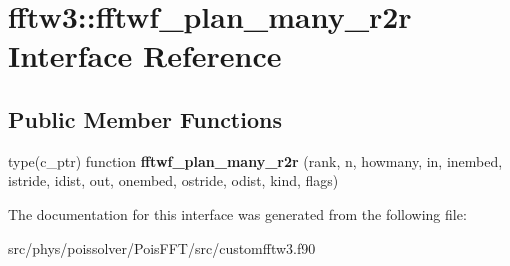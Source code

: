 \hypertarget{interfacefftw3_1_1fftwf__plan__many__r2r}{}\section{fftw3\+:\+:fftwf\+\_\+plan\+\_\+many\+\_\+r2r Interface Reference}
\label{interfacefftw3_1_1fftwf__plan__many__r2r}
\subsection*{Public Member Functions}
\begin{DoxyCompactItemize}
\item 
type(c\+\_\+ptr) function {\bfseries fftwf\+\_\+plan\+\_\+many\+\_\+r2r} (rank, n, howmany, in, inembed, istride, idist, out, onembed, ostride, odist, kind, flags)\hypertarget{interfacefftw3_1_1fftwf__plan__many__r2r_addb62ff135f509acb3f071ebdec5c6cf}{}\label{interfacefftw3_1_1fftwf__plan__many__r2r_addb62ff135f509acb3f071ebdec5c6cf}

\end{DoxyCompactItemize}


The documentation for this interface was generated from the following file\+:\begin{DoxyCompactItemize}
\item 
src/phys/poissolver/\+Pois\+F\+F\+T/src/customfftw3.\+f90\end{DoxyCompactItemize}
